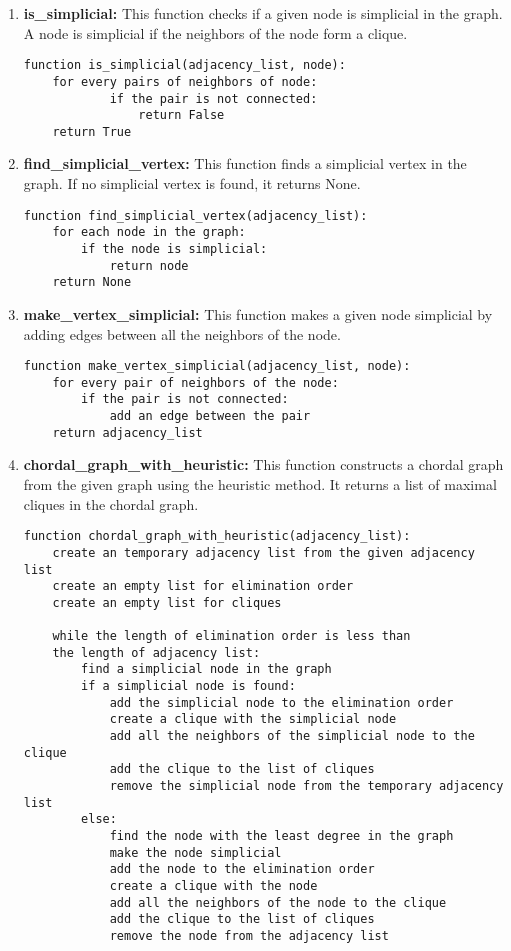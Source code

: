 \documentclass[12pt]{article}
\begin{document}
\begin{enumerate}
    \item \textbf{is\_simplicial:} This function checks if a given node is simplicial in the graph. A node is simplicial if the neighbors of the node form a clique.
    
\begin{verbatim}
function is_simplicial(adjacency_list, node):
    for every pairs of neighbors of node:
            if the pair is not connected:
                return False
    return True
\end{verbatim}

    \item \textbf{find\_simplicial\_vertex:} This function finds a simplicial vertex in the graph. If no simplicial vertex is found, it returns None.
    
\begin{verbatim}
function find_simplicial_vertex(adjacency_list):
    for each node in the graph:
        if the node is simplicial:
            return node
    return None
\end{verbatim}

    \item \textbf{make\_vertex\_simplicial:} This function makes a given node simplicial by adding edges between all the neighbors of the node.
    
\begin{verbatim}
function make_vertex_simplicial(adjacency_list, node):
    for every pair of neighbors of the node:
        if the pair is not connected:
            add an edge between the pair
    return adjacency_list
\end{verbatim}

    \item \textbf{chordal\_graph\_with\_heuristic:} This function constructs a chordal graph from the given graph using the heuristic method. It returns a list of maximal cliques in the chordal graph.
    
\begin{verbatim}
function chordal_graph_with_heuristic(adjacency_list):
    create an temporary adjacency list from the given adjacency list
    create an empty list for elimination order
    create an empty list for cliques

    while the length of elimination order is less than 
    the length of adjacency list:
        find a simplicial node in the graph
        if a simplicial node is found:
            add the simplicial node to the elimination order
            create a clique with the simplicial node
            add all the neighbors of the simplicial node to the clique
            add the clique to the list of cliques
            remove the simplicial node from the temporary adjacency list
        else:
            find the node with the least degree in the graph
            make the node simplicial
            add the node to the elimination order
            create a clique with the node
            add all the neighbors of the node to the clique
            add the clique to the list of cliques
            remove the node from the adjacency list


\end{verbatim}
\end{enumerate}
\end{document}

